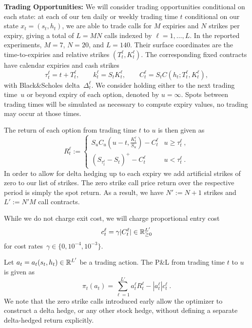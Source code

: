 \noindent
\textbf{Trading Opportunities:}
We will consider trading opportunities conditional on each state: at each of our ten daily or weekly trading time $t$ conditional
on our state $x_t=(s_t,h_t)$, we are able to
trade calls for $M$ expiries and $N$
strikes per expiry, giving a total of $L=MN$ calls indexed by $\ell=1,\ldots,L$. 
In the
reported experiments, $M=7$, $N=20$, and $L=140$. Their surface coordinates are the
time-to-expiries and relative strikes $(T^\ell_t,K^\ell_t)$.
 The corresponding
fixed contracts have calendar expiries and cash strikes
\begin{equation}\label{eq:fixed_contract_coordinates}
 \tau^\ell_t=t+T^\ell_t,
 \qquad
 k^\ell_t=S_tK^\ell_t,
 \qquad
 C_t^\ell=S_tC(h_t;T^\ell_t,K^\ell_t),
\end{equation}
with Black\&Scholes delta~$\Delta_t^\ell$.
We consider holding either to the next trading time~$u$ or beyond expiry of each option, denoted by $u=\infty$. Spots between trading
times will be simulated as necessary to compute expiry values, no trading may occur at those times.


The return of each option from trading time $t$ to $u$ is then given as
\begin{equation}\label{eq:perdiexpriret}
 R_t^\ell
 := \left\{
 \begin{array}{ll}
	 S_u  C_u\left( u -t, \frac{ K^\ell_t }{ S_u } \right) -C_t^\ell & u\geq \tau^\ell_t \ ,\\
	 \left( S_{\tau^\ell_t} - S_t \right)^+  -C_t^\ell & u < \tau^\ell_t \ .
	\end{array}
	\right .
\end{equation}
In order to allow for delta hedging up to each expiry we add artificial strikes of zero to our list of strikes.
The zero strike call price return over the respective period is simply the spot return. As a result, we have $N':=N+1$ strikes
and $L':=N'M$ call contracts.

While we do not charge exit cost, we will charge proportional entry cost
\begin{equation}\label{eq:multi_expiry_costs}
 c_t^{\ell}=\gamma|C_t^\ell| \in \mathbb{R}^{L'}_{\geq 0}
\end{equation}
for cost rates~$\gamma\in\{0,10^{-4},10^{-3}\}$.


Let $a_t=a_t(s_t,h_t)\in\mathbb{R}^{L'}$ be a trading action. The P\&L from trading time $t$ to $u$ is given as
\begin{equation}\label{eq:multi_expiry_group_pnl}
 \pi_t(a_t)
 =
  \sum_{\ell=1}^{L'}
   a_t^\ell R_t^\ell-|a_t^\ell|c_t^\ell \ .
\end{equation}
We note that the zero strike calls introduced early allow the optimizer to construct a delta hedge,
or any other stock hedge, without defining a separate delta-hedged return explicitly.

